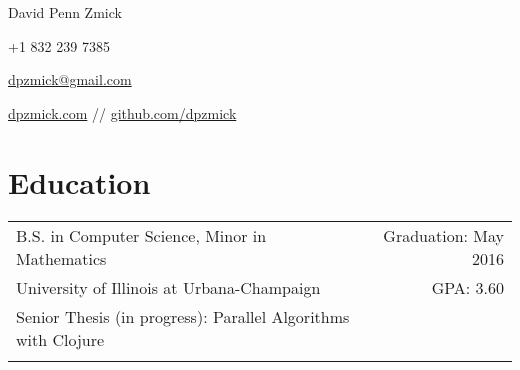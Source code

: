\documentclass[letterpaper,10pt]{article}
\newcommand{\tbl}{3cm}
\newcommand{\tbr}{12.5cm}
\begin{document}
\begin{center}
    {\Large David Penn Zmick}

    +1 832 239 7385

    \href{mailto:dpzmick@gmail.com}{dpzmick@gmail.com}

    \href{http://dpzmick.com}{dpzmick.com} // \href{http://github.com/dpzmick}{github.com/dpzmick}

\end{center}


\section{Education}
\begin{tabular}{p{12.3cm}r}
    B.S. in Computer Science, Minor in Mathematics & Graduation: May 2016\\
    University of Illinois at Urbana-Champaign     & GPA: 3.60\\
    Senior Thesis (in progress): Parallel Algorithms with Clojure \\
    \\
\end{tabular}




\end{document}
